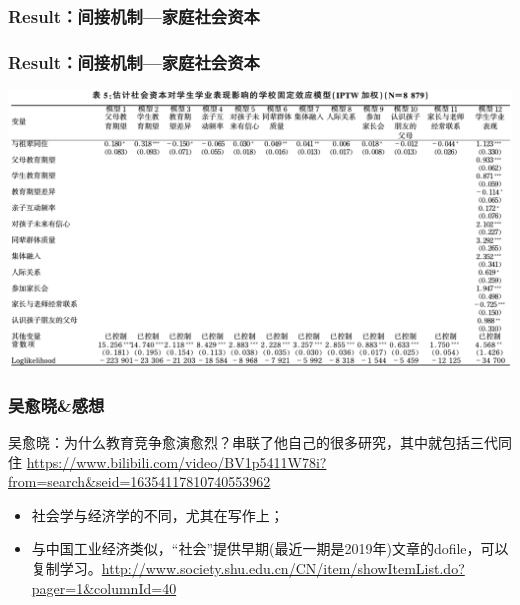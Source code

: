 \documentclass{beamer}
\begin{document}
\begin{frame}
	\frametitle{Result：间接机制---家庭社会资本}

\end{frame}


\begin{frame}
	\frametitle{Result：间接机制---家庭社会资本}
\includegraphics[scale=0.32]{table5}
\end{frame}

\begin{frame}
	\frametitle{吴愈晓\&感想}
 吴愈晓：为什么教育竞争愈演愈烈？串联了他自己的很多研究，其中就包括三代同住 \url{https://www.bilibili.com/video/BV1p5411W78i?from=search&seid=16354117810740553962}

 \begin{itemize}
		\item 社会学与经济学的不同，尤其在写作上；
		\item 与中国工业经济类似，“社会”提供早期(最近一期是2019年)文章的dofile，可以复制学习。\url{http://www.society.shu.edu.cn/CN/item/showItemList.do?pager=1&columnId=40}
\end{itemize}

\end{frame}
\end{document}

